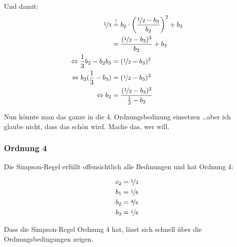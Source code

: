 Und damit:
\begin{align}
    \nicefrac{1}{3} &\stackrel{!}{=} b_2 \cdot \left (\frac{\nicefrac{1}{2} - b_3}{b_2} \right )^2 + b_3\\
                &= \frac{(\nicefrac{1}{2} - b_3)^2}{b_2} + b_3\\
\Leftrightarrow \frac{1}{3} b_2 - b_2 b_3&= (\nicefrac{1}{2} - b_3)^2\\
\Leftrightarrow b_2 (\frac{1}{3} - b_3) &= (\nicefrac{1}{2} - b_3)^2\\
\Leftrightarrow b_2  &= \frac{(\nicefrac{1}{2} - b_3)^2}{\frac{1}{3} - b_3}
\end{align}

Nun könnte man das ganze in die 4. Ordnungsbedinung einsetzen \dots aber ich
glaube nicht, dass das schön wird. Mache das, wer will. 

\subsubsection*{Ordnung 4}
Die Simpson-Regel erfüllt offensichtlich alle Bedinungen und hat
Ordnung 4:

\begin{align}
    c_2 &= \nicefrac{1}{2}\\
    b_1 &= \nicefrac{1}{6}\\
    b_2 &= \nicefrac{4}{6}\\
    b_3 &= \nicefrac{1}{6}
\end{align}

Dass die Simpson-Regel Ordnung 4 hat, lässt sich schnell über
die Ordnungsbedingungen zeigen. 
